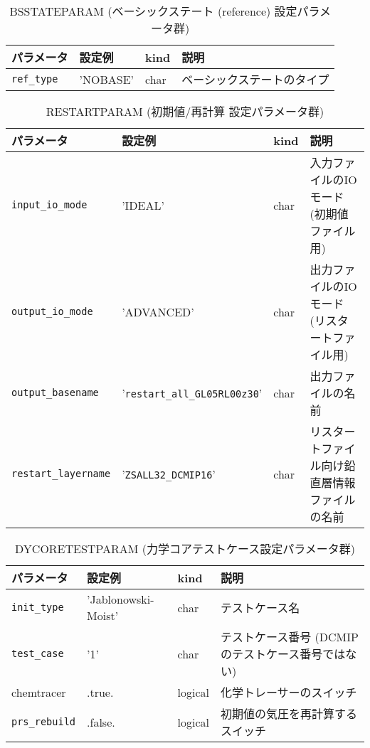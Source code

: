 \begin{table}[htb]
\begin{center}
\caption{BSSTATEPARAM (ベーシックステート (reference) 設定パラメータ群)}
\begin{tabularx}{150mm}{|l|l|l|X|} \hline
 \rowcolor[gray]{0.9} パラメータ & 設定例 & kind & 説明          \\ \hline
 \verb|ref_type| & 'NOBASE' & char & ベーシックステートのタイプ \\ \hline
\end{tabularx}
\end{center}
\end{table}

\begin{table}[htb]
\begin{center}
\caption{RESTARTPARAM (初期値/再計算 設定パラメータ群)}
\begin{tabularx}{150mm}{|l|l|l|X|} \hline
 \rowcolor[gray]{0.9} パラメータ & 設定例 & kind & 説明          \\ \hline
 \verb|input_io_mode|     & 'IDEAL'                   & char & 入力ファイルのIOモード (初期値ファイル用) \\ \hline
 \verb|output_io_mode|    & 'ADVANCED'                & char & 出力ファイルのIOモード (リスタートファイル用) \\ \hline
 \verb|output_basename|   & '\verb|restart_all_GL05RL00z30|' & char & 出力ファイルの名前 \\ \hline
 \verb|restart_layername| & '\verb|ZSALL32_DCMIP16|'         & char & リスタートファイル向け鉛直層情報ファイルの名前 \\ \hline
\end{tabularx}
\end{center}
\end{table}

\begin{table}[htb]
\begin{center}
\caption{DYCORETESTPARAM (力学コアテストケース設定パラメータ群)}
\begin{tabularx}{150mm}{|l|l|l|X|} \hline
 \rowcolor[gray]{0.9} パラメータ & 設定例 & kind & 説明          \\ \hline
 \verb|init_type|    & 'Jablonowski-Moist' & char & テストケース名 \\ \hline
 \verb|test_case|    & '1'     & char & テストケース番号 (DCMIPのテストケース番号ではない) \\ \hline
 chemtracer   & .true.  & logical & 化学トレーサーのスイッチ \\ \hline
 \verb|prs_rebuild|  & .false. & logical & 初期値の気圧を再計算するスイッチ \\ \hline
\end{tabularx}
\end{center}
\end{table}

